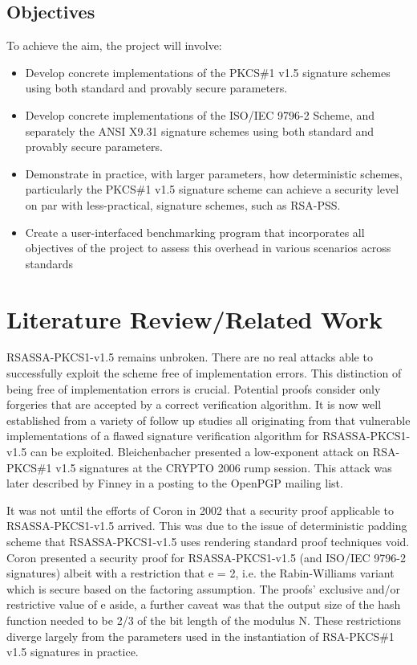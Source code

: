 \documentclass[]{final_report}
\theoremstyle{definition}
\begin{document}
\section{Objectives}
To achieve the aim, the project will involve:
\begin{itemize}
    \item Develop concrete implementations of the PKCS\#1 v1.5 signature schemes using both standard and provably secure parameters.
    \item Develop concrete implementations of  the ISO/IEC 9796-2 Scheme, and separately the ANSI X9.31 signature schemes using both standard and provably secure parameters.
    \item Demonstrate in practice, with larger parameters, how deterministic schemes, particularly the PKCS\#1 v1.5 signature scheme  can achieve a security level on par with less-practical, signature schemes, such as RSA-PSS.
    \item Create a user-interfaced benchmarking program that incorporates all objectives of the project to assess this overhead in various scenarios across standards
\end{itemize}



 
\chapter{Literature Review/Related Work}
RSASSA-PKCS1-v1.5 remains unbroken. There are no real attacks able to successfully exploit the scheme free of implementation errors. This distinction of being free of implementation errors is crucial. Potential proofs consider only forgeries that are accepted by a correct verification algorithm. It is now well established from a variety of follow up studies all originating from \cite{bleichenbacher1998chosen} that vulnerable implementations of a flawed signature verification algorithm for RSASSA-PKCS1-v1.5 can be exploited. Bleichenbacher presented a low-exponent attack on RSA-PKCS\#1 v1.5 signatures at the CRYPTO 2006 rump session. This attack was later described by Finney \cite{finney2006bleichenbacher} in a posting to the OpenPGP mailing list. 

It was not until the efforts of Coron \cite{coron2002security} in 2002 that a security proof applicable to RSASSA-PKCS1-v1.5 arrived. This was due to the issue of deterministic padding scheme that RSASSA-PKCS1-v1.5 uses rendering standard proof techniques void. Coron presented a security proof for RSASSA-PKCS1-v1.5 (and ISO/IEC 9796-2 signatures) albeit with a restriction that e = 2, i.e. the Rabin-Williams variant \cite{coron2002security} which is secure based on the factoring assumption. 
The proofs' exclusive and/or restrictive value of e aside, a further caveat was that the output size of the hash function needed to be 2/3 of the bit length of the modulus N. These restrictions diverge largely from the parameters used in the instantiation of RSA-PKCS\#1 v1.5 signatures in practice. 
\end{document}
